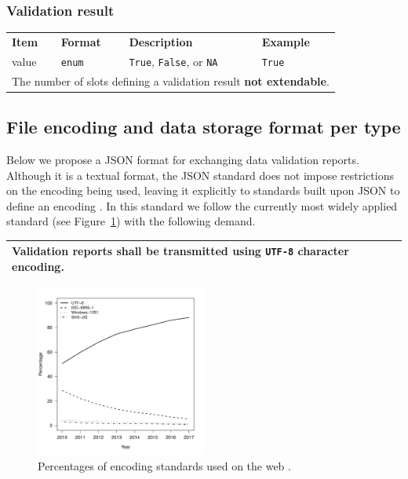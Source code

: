 \documentclass[a4paper, 11pt,titlepage]{article}
\newcommand{\code}[1]{\texttt{#1}}
\newcommand{\waar}{{\normalfont \texttt{True}}}
\newcommand{\onwaar}{{\normalfont \texttt{False}}}
\newcommand{\na}{{\normalfont \texttt{NA}}}
\begin{document}
\subsubsection{Validation result}

\begin{center}
\begin{tabular}{|lp{15mm}p{}p{}|}
\hline
\textbf{Item} & \textbf{Format} & \textbf{Description} &\textbf{Example}\\
value  & \code{enum} & \waar{}, \onwaar{}, or \na{}    &\waar{}\\
\hline
\multicolumn{4}{|l|}{The number of slots defining a validation result \textbf{not extendable}.
}\\
\hline
\end{tabular}
\end{center}

\subsection{File encoding and data storage format per type}
Below we propose a JSON format \citep{ecma2013json} for exchanging data
validation reports.  Although it is a textual format, the JSON standard does
not impose restrictions on the encoding being used, leaving it explicitly to
standards built upon JSON to define an encoding \citep[pp ii]{ecma2013json}. In
this standard we follow the currently most widely applied standard (see
Figure~\ref{fig:encoding}) with the following demand.

\begin{center}
\label{tab:encoding}
\begin{tabular}{|l|}
\hline
Validation reports shall be transmitted using \code{UTF-8} character encoding.\\
\hline
\end{tabular}
\end{center}

\begin{figure}[t]
\centering
\includegraphics[width=0.5\textwidth]{fig/encoding_use.pdf}
\caption{Percentages of encoding standards used on the web \citep{w3techs2017}.}
\label{fig:encoding}
\end{figure}
\end{document}
